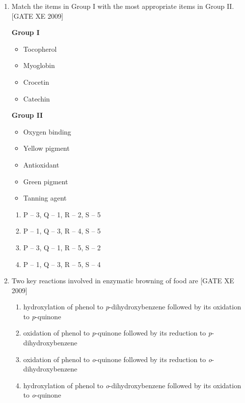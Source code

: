 \documentclass[journal,12pt,onecolumn]{IEEEtran}
\theoremstyle{remark}
\begin{document}
\begin{enumerate}[label=\textbf{Q.\arabic*.}, wide=0pt, leftmargin=*]
\item Match the items in Group I with the most appropriate items in Group II.\hfill[GATE XE 2009]

\begin{minipage}[t]{0.45\textwidth}
\textbf{Group I}
\begin{itemize}
  \item[P.] Tocopherol
  \item[Q.] Myoglobin
  \item[R.] Crocetin
  \item[S.] Catechin
\end{itemize}
\end{minipage}
\hfill
\begin{minipage}[t]{0.45\textwidth}
\textbf{Group II}
\begin{itemize}
  \item[1.] Oxygen binding
  \item[2.] Yellow pigment
  \item[3.] Antioxidant
  \item[4.] Green pigment
  \item[5.] Tanning agent
\end{itemize}
\end{minipage}

\vspace{1em}

\begin{multicols}{2}
\begin{enumerate}
\item P -- 3, Q -- 1, R -- 2, S -- 5
\item P -- 1, Q -- 3, R -- 4, S -- 5
\item P -- 3, Q -- 1, R -- 5, S -- 2
\item P -- 1, Q -- 3, R -- 5, S -- 4
\end{enumerate}
\end{multicols}

\item Two key reactions involved in enzymatic browning of food are
\hfill[GATE XE 2009]
\begin{multicols}{2}
\begin{enumerate}
\item hydroxylation of phenol to \textit{p}-dihydroxybenzene followed by its oxidation to \textit{p}-quinone
\item oxidation of phenol to \textit{p}-quinone followed by its reduction to \textit{p}-dihydroxybenzene
\item oxidation of phenol to \textit{o}-quinone followed by its reduction to \textit{o}-dihydroxybenzene
\item hydroxylation of phenol to \textit{o}-dihydroxybenzene followed by its oxidation to \textit{o}-quinone
\end{enumerate}
\end{multicols}


\end{enumerate}
\end{document}
